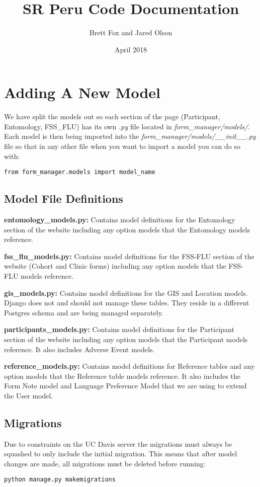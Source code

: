\documentclass{article}
\title{ SR Peru Code Documentation}
\author{ Brett Fox and Jared Olson }
\date{ April 2018 }
\begin{document}
\maketitle

\newpage
\tableofcontents
\newpage

\section{Adding A New Model}
We have split the models out so each section of the page (Participant, Entomology, FSS\_FLU) has its own \textit{.py} file located in \textit{form\_manager/models/}.  Each model is then being imported into the \textit{form\_manager/models/\_\_init\_\_.py} file so that in any other file when you want to import a model you can do so with:
\begin{verbatim}
from form_manager.models import model_name
\end{verbatim}
\subsection{Model File Definitions}
\textbf{entomology\_models.py:} Contains model definitions for the Entomology section of the website including any option models that the Entomology models reference.

\textbf{fss\_flu\_models.py:} Contains model definitions for the FSS-FLU section of the website (Cohort and Clinic forms) including any option models that the FSS-FLU models reference.

\textbf{gis\_models.py:} Contains model definitions for the GIS and Location models.  Django does not and should not manage these tables.  They reside in a different Postgres schema and are being managed separately.

\textbf{participants\_models.py:} Contains model definitions for the Participant section of the website including any option models that the Participant models reference. It also includes Adverse Event models.

\textbf{reference\_models.py:} Contains model definitions for Reference tables and any option models that the Reference table models reference.  It also includes the Form Note model and Language Preference Model that we are using to extend the User model.

\subsection{Migrations}
Due to constraints on the UC Davis server the migrations must always be squashed to only include the initial migration.  This means that after model changes are made, all migrations must be deleted before running:
\begin{lstlisting}[language=bash]
  python manage.py makemigrations
\end{lstlisting}
\end{document}
